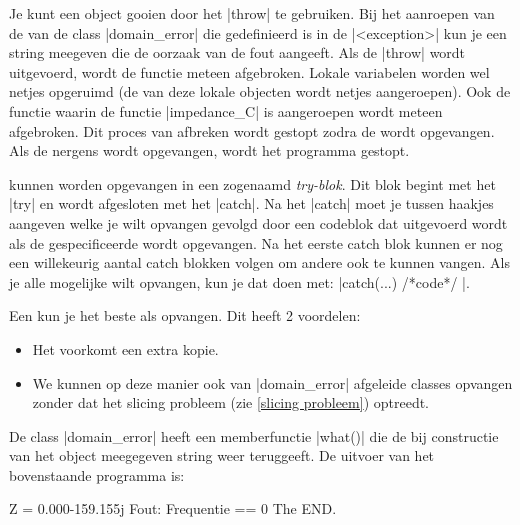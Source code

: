 \begin{cpplstShortInline}

Je kunt een  object gooien door het \Cpp{}  |throw| te gebruiken.
Bij het aanroepen van de  van de class |domain_error| die gedefinieerd is in de  |<exception>| kun je een string meegeven die de oorzaak van de fout aangeeft.
Als de |throw| wordt uitgevoerd, wordt de functie meteen afgebroken.
Lokale variabelen worden wel netjes opgeruimd (de  van deze lokale objecten wordt netjes aangeroepen).
Ook de functie waarin de functie |impedance_C| is aangeroepen wordt meteen afgebroken.
Dit proces van afbreken wordt gestopt zodra de  wordt opgevangen.
Als de  nergens wordt opgevangen, wordt het programma gestopt.


 kunnen worden opgevangen in een zogenaamd \emph{try\hyp{}blok}.
Dit blok begint met het  |try| en wordt afgesloten met het  |catch|.
Na het |catch|  moet je tussen haakjes aangeven welke  je wilt opvangen gevolgd door een codeblok dat uitgevoerd wordt als de gespecificeerde  wordt opgevangen.
Na het eerste catch blok kunnen er nog een willekeurig aantal catch blokken volgen om andere  ook te kunnen vangen.
Als je alle mogelijke  wilt opvangen, kun je dat doen met: |catch(...) { /*code*/ }|.

Een  kun je het beste als  opvangen.
Dit heeft 2 voordelen:
\begin{itemize}
    \item Het voorkomt een extra kopie.
    \item We kunnen op deze manier ook van |domain_error| afgeleide classes opvangen zonder dat het slicing probleem (zie \cref{slicing probleem}) optreedt.
\end{itemize}

De class |domain_error| heeft een memberfunctie |what()| die de bij constructie van het object meegegeven string weer teruggeeft.
De uitvoer van het bovenstaande programma is:

\begin{coutput}
Z = 0.000-159.155j
Fout: Frequentie == 0
The END.
\end{coutput}


\end{cpplstShortInline}

